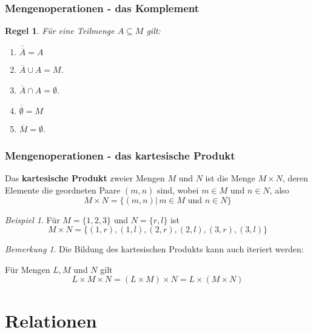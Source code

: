 \documentclass[hyperref={pdfpagelabels=false}]{beamer}
\theoremstyle{plain}%
\newtheorem*{regel}{Regel}
\theoremstyle{definition}
\theoremstyle{remark}
\newtheorem*{beispiel}{Beispiel}
\newtheorem*{notiz}{Bemerkung}
\begin{document}
\begin{frame}
\frametitle{Mengenoperationen - das Komplement}

\begin{regel}\label{mengen_regel_komplement} F\"ur eine Teilmenge $A \subseteq M$ gilt:
\begin{enumerate}
\item<2-> $\overline{\overline{A}} = A$
\item<3-> $\overline{A} \cup A = M$.
\item<4-> $\overline{A} \cap A = \emptyset$.
\item<5-> $\overline{\emptyset} = M$
\item<6-> $\overline{M} = \emptyset$.
\end{enumerate}
\end{regel}

\end{frame}

\begin{frame}
\frametitle{Mengenoperationen - das kartesische Produkt}

\begin{definition} Das \textbf{kartesische Produkt} zweier Mengen $M$ und $N$ ist 
die Menge $M \times N$, deren Elemente die geordneten Paare $(m, n)$ sind, wobei $m \in M$ und $n \in N$, also
  	$$ M \times N = \{ (m, n) \vert \, m \in M \textrm{ und } n \in  N \} $$
\end{definition}

\pause 

\begin{beispiel}
Für $M = \{1,2,3\}$ und $N = \{r,l\}$ ist 
	$$ M \times N = \{(1,r), (1,l), (2,r), (2,l), (3,r), (3,l) \} $$
\end{beispiel}

\pause 

\begin{notiz}
Die Bildung des kartesischen Produkts kann auch iteriert werden: 

Für Mengen $L, M$ und $N$ gilt 
	$$ L \times M \times N = (L \times M) \times N = L \times (M \times N) $$
\end{notiz}

\end{frame}

\section{Relationen}
\end{document}
